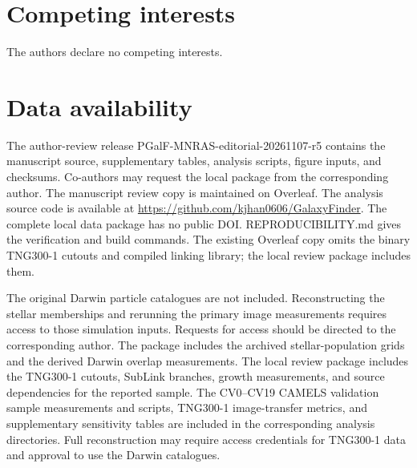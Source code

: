 \documentclass[usenatbib]{mnras}
\begin{document}
\section*{Competing interests}
The authors declare no competing interests.

\section*{Data availability}

The author-review release PGalF-MNRAS-editorial-20261107-r5 contains the
manuscript source, supplementary tables, analysis scripts, figure inputs,
and checksums. Co-authors may request the local package from the
corresponding author. The manuscript review copy is maintained on Overleaf. The analysis source
code is available at \url{https://github.com/kjhan0606/GalaxyFinder}.
The complete local data package has no public DOI.
REPRODUCIBILITY.md gives the verification and build commands. The existing
Overleaf copy omits the binary TNG300-1 cutouts and compiled linking library;
the local review package includes them.

The original Darwin particle catalogues are not included. Reconstructing
the stellar memberships and rerunning the primary image measurements
requires access to those simulation inputs. Requests for access should be
directed to the corresponding author. The package includes the archived
stellar-population grids and the derived Darwin overlap measurements. The
local review package includes the TNG300-1 cutouts, SubLink branches, growth
measurements, and source dependencies for the reported sample. The CV0--CV19 CAMELS validation sample
measurements and scripts, TNG300-1 image-transfer metrics, and supplementary
sensitivity tables are included in the corresponding analysis directories. Full
reconstruction may require access credentials for TNG300-1 data and
approval to use the Darwin catalogues.
\end{document}
